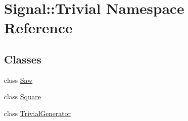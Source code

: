 \hypertarget{namespaceSignal_1_1Trivial}{\section{Signal\+:\+:Trivial Namespace Reference}
\label{namespaceSignal_1_1Trivial}
}
\subsection*{Classes}
\begin{DoxyCompactItemize}
\item 
class \hyperlink{classSignal_1_1Trivial_1_1Saw}{Saw}
\item 
class \hyperlink{classSignal_1_1Trivial_1_1Square}{Square}
\item 
class \hyperlink{classSignal_1_1Trivial_1_1TrivialGenerator}{Trivial\+Generator}
\end{DoxyCompactItemize}

